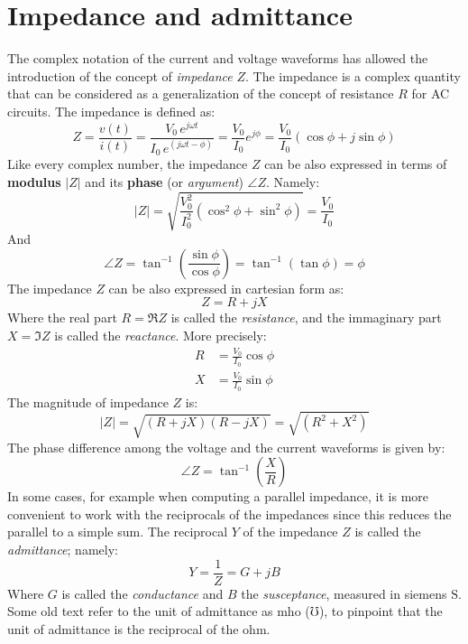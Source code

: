 \section{Impedance and admittance}
The complex notation of the current and voltage waveforms has allowed the introduction of the concept of \emph{impedance} $Z$. The impedance is a complex quantity that can be considered as a generalization of the concept of resistance $R$ for AC circuits. The impedance is defined as:
\begin{equation}
Z = \frac{v(t)}{i(t)} =\frac{V_0\,e^{j\omega t}}{I_0\,e^{(j\omega t -\phi)}} = \frac{V_0}{I_0}e^{j\phi} =
\frac{V_0}{I_0}\left(\cos\phi + j\sin\phi\right) 
\end{equation}
Like every complex number, the impedance $Z$ can be also expressed in terms of \textbf{modulus} $|Z|$ and its \textbf{phase} (or \emph{argument}) $\angle Z$. Namely:
\begin{equation}
|Z| = \sqrt{\frac{V_0^2}{I_0^2}\left(\cos^2\phi + \sin^2\phi\right)} = \frac{V_0}{I_0}
\end{equation}
And
\begin{equation}
\angle Z =\tan^{-1}\left(\frac{\sin\phi}{\cos\phi}\right)=\tan^{-1}(\tan\phi) = \phi
\end{equation}
The impedance $Z$ can be also expressed in cartesian form as:
\begin{equation}
\label{eq:impedance}
Z = R + jX
\end{equation}
Where the real part $R=\Re{Z}$ is called the \emph{resistance}, and the immaginary part $X=\Im{Z}$ is called the \emph{reactance}. More precisely:
\begin{align*} 
R &=  \frac{V_0}{I_0}\cos\phi \\ 
X &=  \frac{V_0}{I_0}\sin\phi
\end{align*}
The magnitude of impedance $Z$ is:
\begin{equation}
|Z| = \sqrt{(R+jX)(R-jX)} = \sqrt{(R^2+X^2)}
\end{equation}
The phase difference among the voltage and the current waveforms is given by:
\begin{equation}
\angle Z = \tan^{-1}\left(\frac{X}{R}\right)
\end{equation} 
In some cases, for example when computing a parallel impedance, it is more convenient to work with the reciprocals of the impedances since this reduces the parallel to a simple sum. The reciprocal $Y$ of the impedance $Z$ is called the \emph{admittance}; namely:
\begin{equation}
\label{eq:admittance}
Y = \frac{1}{Z} = G +jB
\end{equation}
Where $G$ is called the \emph{conductance} and $B$ the  \emph{susceptance}, measured in siemens $\textrm{S}$. Some old text refer to the unit of admittance as $\textrm{mho}$ ($\mho$), to pinpoint that the unit of admittance is the reciprocal of the $\textrm{ohm}$.

